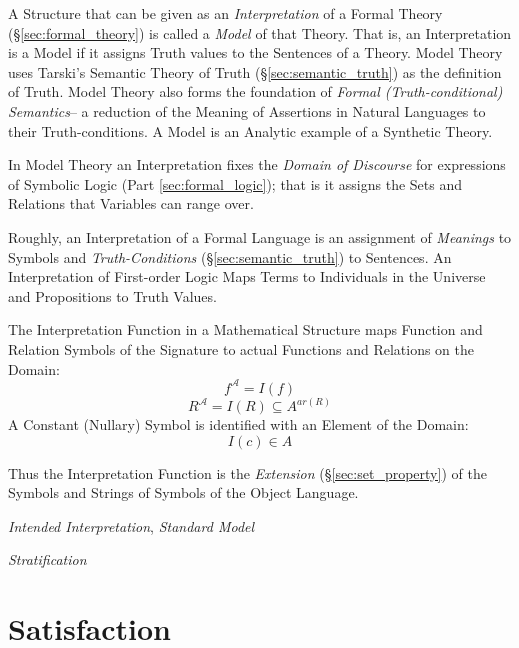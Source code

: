 A Structure that can be given as an \emph{Interpretation} of a Formal
Theory (\S\ref{sec:formal_theory}) is called a \emph{Model} of that
Theory. That is, an Interpretation is a Model if it assigns Truth
values to the Sentences of a Theory. Model Theory uses Tarski's
Semantic Theory of Truth (\S\ref{sec:semantic_truth}) as the
definition of Truth. Model Theory also forms the foundation of
\emph{Formal (Truth-conditional) Semantics}-- a reduction of the
Meaning of Assertions in Natural Languages to their Truth-conditions.
A Model is an Analytic example of a Synthetic Theory. \cite{shulman15}

In Model Theory an Interpretation fixes the \emph{Domain of Discourse}
for expressions of Symbolic Logic (Part \ref{sec:formal_logic}); that
is it assigns the Sets and Relations that Variables can range over.

Roughly, an Interpretation of a Formal Language is an assignment of
\emph{Meanings} to Symbols and \emph{Truth-Conditions}
(\S\ref{sec:semantic_truth}) to Sentences. An Interpretation of
First-order Logic Maps Terms to Individuals in the Universe and
Propositions to Truth Values.

The Interpretation Function in a Mathematical Structure maps Function
and Relation Symbols of the Signature to actual Functions and
Relations on the Domain:
\[
    f^{\mathcal{A}} = I (f)
\]
\[
    R^{\mathcal{A}} = I (R) \subseteq A^{ar(R)}
\]
A Constant (Nullary) Symbol is identified with an Element of the
Domain:
\[
    I(c) \in A
\]

Thus the Interpretation Function is the \emph{Extension}
(\S\ref{sec:set_property}) of the Symbols and Strings of Symbols of
the Object Language.

\emph{Intended Interpretation}, \emph{Standard Model}

\emph{Stratification}



\section{Satisfaction}\label{sec:satisfaction}

